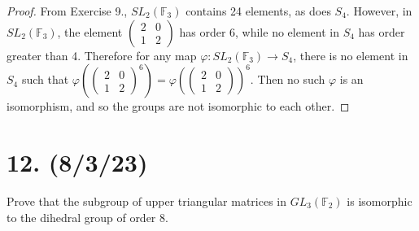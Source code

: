 \documentclass{article}
\begin{document}
\begin{proof}
    From Exercise 9., $SL_2(\mathbb{F}_3)$ contains 24 elements, as does $S_4$. However, in $SL_2(\mathbb{F}_3)$, the element $\begin{pmatrix}2 & 0 \\ 1 & 2\end{pmatrix}$ has order 6, while no element in $S_4$ has order greater than 4. Therefore for any map $\varphi: SL_2(\mathbb{F}_3) \rightarrow S_4$, there is no element in $S_4$ such that $\varphi(\begin{pmatrix}2 & 0 \\ 1 & 2\end{pmatrix}^6) = \varphi(\begin{pmatrix}2 & 0 \\ 1 & 2\end{pmatrix})^6$. Then no such $\varphi$ is an isomorphism, and so the groups are not isomorphic to each other.
\end{proof}

\section*{12. (8/3/23)}

Prove that the subgroup of upper triangular matrices in $GL_3(\mathbb{F}_2)$ is isomorphic to the dihedral group of order 8.
\end{document}
